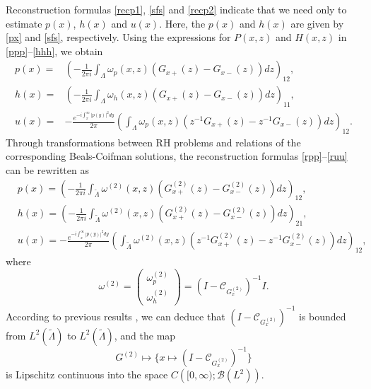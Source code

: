 \documentclass[preprint,compress,12pt]{elsarticle}
\numberwithin{equation}{section}
\begin{document}
Reconstruction formulas \eqref{recp1}, \eqref{sfs} and \eqref{recp2} indicate that we need only to estimate $p(x)$, $h(x)$ and $u(x)$. Here, the $p(x)$ and $h(x)$ are given by \eqref{px} and \eqref{sfs}, respectively. Using the expressions for $P(x,z)$ and $H(x,z)$ in \eqref{ppp}--\eqref{hhh}, we obtain
\begin{align}
p(x)= & \left(-\frac{1}{2\pi i} \int_{\Lambda}\omega_{p}(x,z)\left(G_{x+}(z)-G_{x-}(z)\right)dz\right)_{12},\label{rpp}\\
h(x)= &\left(-\frac{1}{2\pi i} \int_{\Lambda}\omega_{h}(x,z)\left(G_{x+}(z)-G_{x-}(z)\right)dz\right)_{11},\label{rhh}\\
u(x)= &-\frac{e^{-i\int_{x}^{\infty}|p(y)|^{2}dy}}{2\pi} \left(\int_{\Lambda}\omega_{p}(x,z)\left(z^{-1}G_{x+}(z)-z^{-1}G_{x-}(z)\right)dz\right)_{12}.\label{ruu}
\end{align}
Through transformations between RH problems and relations of the corresponding Beals-Coifman solutions, the reconstruction formulas \eqref{rpp}--\eqref{ruu} can be rewritten as
\begin{align}
&p(x)= \left(-\frac{1}{2\pi i} \int_{\widetilde{\Lambda}}\omega^{(2)}(x,z)\left(G^{(2)}_{x+}(z)-G^{(2)}_{x-}(z)\right)dz\right)_{12},\label{rrp}\\
&h(x)= \left(-\frac{1}{2\pi i} \int_{\widetilde{\Lambda}}\omega^{(2)}(x,z)\left(G^{(2)}_{x+}(z)-G^{(2)}_{x-}(z)\right)dz\right)_{21},\label{rrh}\\
&u(x)= -\frac{e^{-i\int_{x}^{\infty}|p(y)|^{2}dy}}{2\pi} \left(\int_{\widetilde{\Lambda}}\omega^{(2)}(x,z)\left(z^{-1}G^{(2)}_{x+}(z)-z^{-1}G^{(2)}_{x-}(z)\right)dz\right)_{12},\label{rru}
\end{align}
where
\begin{equation}
\omega^{(2)}=\begin{pmatrix}\omega_{p}^{(2)}\\ \omega_{h}^{(2)}\end{pmatrix}=(I-\mathcal{C}_{G^{(2)}_{x}})^{-1}I.
\end{equation}
According to previous results \cite{LiY}, we can deduce that
$(I-\mathcal{C}_{G^{(2)}_{x}})^{-1}$ is bounded from  $L^{2}(\widetilde{\Lambda})$ to $L^{2}(\widetilde{\Lambda})$, and the map
\begin{equation}\label{lpxz}
G^{(2)}\mapsto\{x\mapsto (I-\mathcal{C}_{G^{(2)}_{x}})^{-1}\}
\end{equation}
is Lipschitz continuous into the space $C\left([0,\infty);\mathscr{B}\left(L^{2}\right)\right)$.
\end{document}
